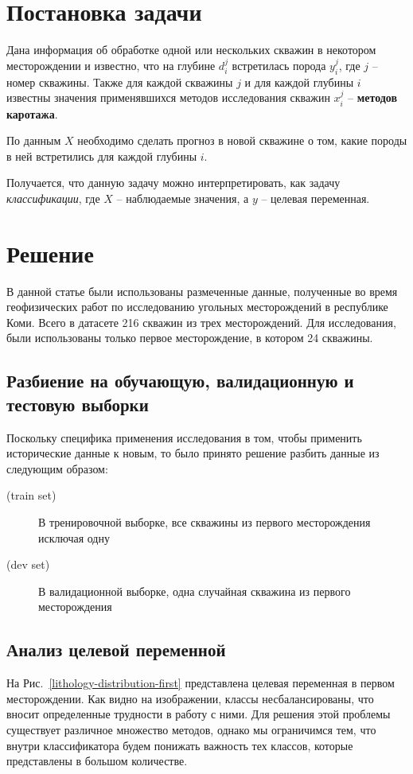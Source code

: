 \documentclass[aps,%
12pt,%
final,%
oneside,
onecolumn,%
musixtex, %
superscriptaddress,%
centertags]{article} %
\begin{document}
\section{Постановка задачи}
Дана информация об обработке одной или нескольких скважин в некотором месторождении и известно, что на глубине $d^j_i$ встретилась порода $y^j_i$, где $j$ -- номер скважины. Также для каждой скважины $j$ и для каждой глубины $i$ известны значения применявшихся методов исследования скважин $x^j_i$ -- \textbf{методов каротажа}.

По данным $X$ необходимо сделать прогноз в новой скважине о том, какие породы в ней встретились для каждой глубины $i$.

Получается, что данную задачу можно интерпретировать, как задачу \textit{классификации}, где $X$ -- наблюдаемые значения, а $y$ -- целевая переменная.

\section{Решение}
В данной статье были использованы размеченные данные, полученные во время геофизических работ по исследованию угольных месторождений в республике Коми. Всего в датасете 216 скважин из трех месторождений. Для исследования, были использованы только первое месторождение, в котором 24 скважины.

\subsection{Разбиение на обучающую, валидационную и тестовую выборки}
Поскольку специфика применения исследования в том, чтобы применить исторические данные к новым, то было принято решение разбить данные из следующим образом:
\begin{description}
  \item [(train set)] В тренировочной выборке, все скважины из первого месторождения исключая одну
  \item [(dev set)] В валидационной выборке, одна случайная скважина из первого месторождения
\end{description}

\subsection{Анализ целевой переменной}

На Рис.~\ref{lithology-distribution-first} представлена целевая переменная в первом месторождении. Как видно на изображении, классы несбалансированы, что вносит определенные трудности в работу с ними. Для решения этой проблемы существует различное множество методов, однако мы ограничимся тем, что внутри классификатора будем понижать важность тех классов, которые представлены в большом количестве.
\end{document}
